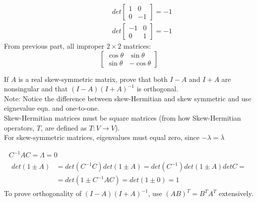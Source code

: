 \documentclass[twoside]{amsart}
\theoremstyle{plain}
\theoremstyle{definition}
\newcommand{\exercisehead}[1]
  {
   \noindent{\small\bf Exercise #1.}
   \smallskip}
\begin{document}
\begin{enumerate}
\[\begin{aligned}
\end{aligned} \quad \quad \, \begin{aligned}
  & det{ \left[ \begin{matrix} 1 & 0 \\ 0 & -1 \end{matrix} \right]} = -1 \\ 
  &  det{ \left[ \begin{matrix} -1 & 0 \\ 0 & 1 \end{matrix} \right]} = -1 
\end{aligned}
\]
From previous part, all improper $2\times 2$ matrices: \[
\left[ \begin{matrix} \cos{\theta} & \sin{\theta} \\ \sin{\theta} & -\cos{\theta} \end{matrix} \right]
\]
\end{enumerate}

\exercisehead{13} If $A$ is a real skew-symmetric matrix, prove that both $I-A$ and $I+A$ are nonsingular and that $(I-A)(I+A)^{-1}$ is orthogonal.  \\

Note: Notice the difference between skew-Hermitian and skew symmetric and use eignevalue eqn. and one-to-one.  \\

Skew-Hermitian matrices must be square matrices (from how Skew-Hermitian operators, $T$, are defined as $T:V\to V$).  \\
For skew-symmetric matrices, eigenvalues must equal zero, since $-\lambda = \overline{\lambda}$

\[
\begin{gathered}
  C^{-1}AC = \Lambda =0  \\
  \begin{aligned}
    det{(1 \pm A)} & = det{ (C^{-1} C)}det{(1\pm A)} = det{(C^{-1})} det{(1\pm A)} det{C} = \\
    & = det{( 1 \pm C^{-1}AC)}= det{(1\pm 0)} = \boxed{ 1}
  \end{aligned}
\end{gathered}
\]
To prove orthogonality of $(I-A)(I+A)^{-1}$, use $(AB)^T = B^T A^T$ extensively.  
\end{document}
